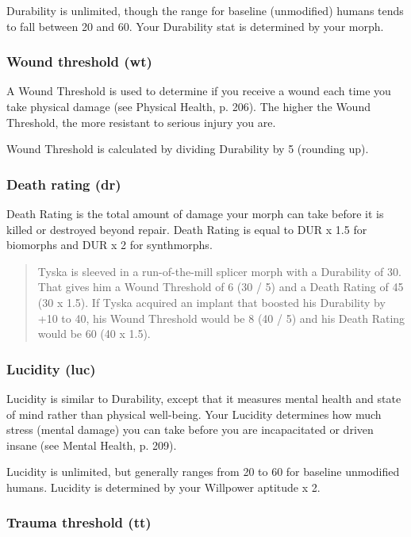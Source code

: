 Durability is unlimited, though the range for baseline (unmodified)
humans tends to fall between 20 and 60. Your Durability stat is
determined by your morph.

\subsubsection{Wound threshold (wt)}
\label{sec:wound-threshold-wt}

A Wound Threshold is used to determine if you receive a wound each
time you take physical damage (see Physical Health, p. 206). The
higher the Wound Threshold, the more resistant to serious injury you
are.

Wound Threshold is calculated by dividing Durability by 5 (rounding
up).

\subsubsection{Death rating (dr)}
\label{sec:death-rating-dr}

Death Rating is the total amount of damage your morph can take before
it is killed or destroyed beyond repair. Death Rating is equal to DUR
x 1.5 for biomorphs and DUR x 2 for synthmorphs.

\begin{quotation}
  Tyska is sleeved in a run-of-the-mill splicer morph with a
  Durability of 30. That gives him a Wound Threshold of 6 (30 / 5) and
  a Death Rating of 45 (30 x 1.5). If Tyska acquired an implant that
  boosted his Durability by +10 to 40, his Wound Threshold would be 8
  (40 / 5) and his Death Rating would be 60 (40 x 1.5).
\end{quotation}

\subsubsection{Lucidity (luc)}
\label{sec:lucidity-luc}

Lucidity is similar to Durability, except that it measures mental
health and state of mind rather than physical well-being. Your
Lucidity determines how much stress (mental damage) you can take
before you are incapacitated or driven insane (see Mental Health,
p. 209).

Lucidity is unlimited, but generally ranges from 20 to 60 for baseline
unmodified humans. Lucidity is determined by your Willpower aptitude x
2.

\subsubsection{Trauma threshold (tt)}
\label{sec:trauma-threshold-tt}

